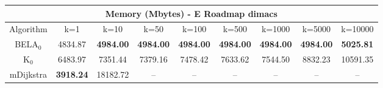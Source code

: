 \begin{tabular}{c|cccccccc}\toprule
\multicolumn{9}{c}{Memory (Mbytes) - E Roadmap dimacs}\\ \midrule
Algorithm & k=1 & k=10 & k=50 & k=100 & k=500 & k=1000 & k=5000 & k=10000 \\ \midrule
BELA$_0$ & 4834.87 & \textbf{4984.00} & \textbf{4984.00} & \textbf{4984.00} & \textbf{4984.00} & \textbf{4984.00} & \textbf{4984.00} & \textbf{5025.81} \\
K$_0$ & 6483.97 & 7351.44 & 7379.16 & 7478.42 & 7633.62 & 7544.50 & 8832.23 & 10591.35 \\
mDijkstra & \textbf{3918.24} & 18182.72 & -- & -- & -- & -- & -- & -- \\ \bottomrule 
\end{tabular}
